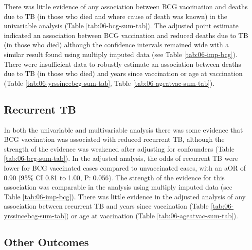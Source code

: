 \documentclass[11pt,twoside]{bristolthesis}
\begin{document}
  There was little evidence of any association between BCG vaccination and deaths due to TB (in those who died and where cause of death was known) in the univariable analysis (Table \ref{tab:06-bcg-sum-tab}). The adjusted point estimate indicated an association between BCG vaccination and reduced deaths due to TB (in those who died) although the confidence intervals remained wide with a similar result found using multiply imputed data (see Table \ref{tab:06-imp-bcg}). There were insufficient data to robustly estimate an association between deaths due to TB (in those who died) and years since vaccination or age at vaccination (Table \ref{tab:06-yrssincebcg-sum-tab}, Table \ref{tab:06-ageatvac-sum-tab}).
  
  \hypertarget{recurrent-tb}{%
  \subsection{Recurrent TB}\label{recurrent-tb}}
  
  In both the univariable and multivariable analysis there was some evidence that BCG vaccination was associated with reduced recurrent TB, although the strength of the evidence was weakened after adjusting for confounders (Table \ref{tab:06-bcg-sum-tab}). In the adjusted analysis, the odds of recurrent TB were lower for BCG vaccinated cases compared to unvaccinated cases, with an aOR of 0.90 (95\% CI 0.81 to 1.00, P: 0.056). The strength of the evidence for this association was comparable in the analysis using multiply imputed data (see Table \ref{tab:06-imp-bcg}). There was little evidence in the adjusted analysis of any association between recurrent TB and years since vaccination (Table \ref{tab:06-yrssincebcg-sum-tab}) or age at vaccination (Table \ref{tab:06-ageatvac-sum-tab}).
  
  \hypertarget{other-outcomes}{%
  \subsection{Other Outcomes}\label{other-outcomes}}
  
\end{document}
